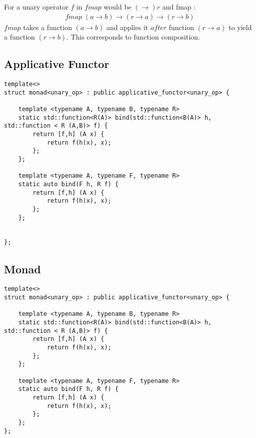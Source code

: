 \documentclass[12pt,fleqn]{article}
\begin{document}
For a unary operator $f$ in $fmap$  would be $(\rightarrow) r$ and fmap :
\begin{eqnarray*}
fmap \; (a \rightarrow b) \rightarrow (r \rightarrow a) \rightarrow (r \rightarrow b)
\end{eqnarray*}
$fmap$ takes a function $(a\rightarrow b)$ and applies it $after$ function $(r \rightarrow a)$ to yield a function $(r \rightarrow b)$.
This corresponds to function composition.

%
%
\subsection{Applicative Functor}
%
%
\begin{minipage}{\linewidth}
\begin{lstlisting}[caption=applicative functor for unary operators, label=appfunop]
template<>
struct monad<unary_op> : public applicative_functor<unary_op> {

	template <typename A, typename B, typename R>
	static std::function<R(A)> bind(std::function<B(A)> h, std::function < R (A,B)> f) {
		return [f,h] (A x) {
			return f(h(x), x);
		};
	};
	
	template <typename A, typename F, typename R>
	static auto bind(F h, R f) {
		return [f,h] (A x) {
			return f(h(x), x);
		};
	};
	
	
};
\end{lstlisting}
\end{minipage}


\subsection{Monad}

\begin{minipage}{\linewidth}
\begin{lstlisting}[caption=monad for unary operators, label=monadop]
template<>
struct monad<unary_op> : public applicative_functor<unary_op> {

	template <typename A, typename B, typename R>
	static std::function<R(A)> bind(std::function<B(A)> h, std::function < R (A,B)> f) {
		return [f,h] (A x) {
			return f(h(x), x);
		};
	};
	
	template <typename A, typename F, typename R>
	static auto bind(F h, R f) {
		return [f,h] (A x) {
			return f(h(x), x);
		};
	};
};
\end{lstlisting}
\end{minipage}
\end{document}
